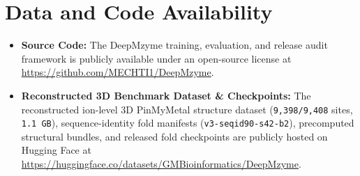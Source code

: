 \documentclass[10pt,a4paper,twocolumn]{article}
\begin{document}
\section{Data and Code Availability}

\begin{itemize}
  \item \textbf{Source Code:} The DeepMzyme training, evaluation, and release audit framework is publicly available under an open-source license at \url{https://github.com/MECHTI1/DeepMzyme}.
  \item \textbf{Reconstructed 3D Benchmark Dataset \& Checkpoints:} The reconstructed ion-level 3D PinMyMetal structure dataset (\texttt{9,398/9,408} sites, \texttt{1.1 GB}), sequence-identity fold manifests (\texttt{v3-seqid90-s42-b2}), precomputed structural bundles, and released fold checkpoints are publicly hosted on Hugging Face at \url{https://huggingface.co/datasets/GMBioinformatics/DeepMzyme}.
\end{itemize}



\end{document}
